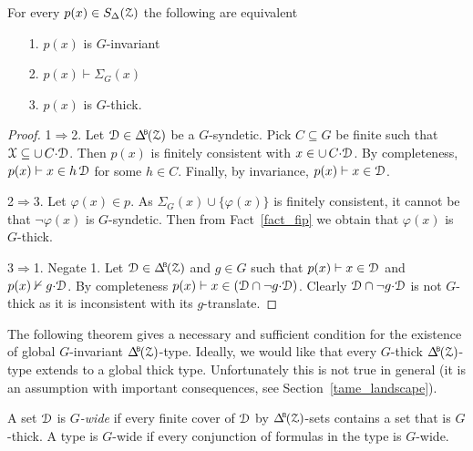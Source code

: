 
\begin{theorem}\label{thm_syndetic_invariant}
  For every $p(x)\in S_\Delta(\EuScript Z)$ the following are equivalent
  \begin{itemize}
    \item[1.] $p(x)$ is $G$-invariant
    \item[2.] $p(x)\vdash\Sigma_G(x)$
    \item[3.] $p(x)$ is $G$-thick.
  \end{itemize}
\end{theorem}

\begin{proof}
  1$\Rightarrow$2.
  Let $\D\in\BDelta(\Z)$ be a $G$-syndetic.
  Pick $C\subseteq G$ be finite such that $\EuScript X\subseteq\cup\,C{\cdot}\EuScript D$.
  Then $p(x)$ is finitely consistent with $x\in\cup\,C{\cdot}\EuScript D$.
  By completeness, $p(x)\vdash x\in h\,\EuScript D$ for some $h\in C$.
  Finally, by invariance, $p(x)\vdash x\in\EuScript D$.
  
  2$\Rightarrow$3.
  Let $\varphi(x)\in p$.
  As $\Sigma_G(x)\cup\{\varphi(x)\}$ is finitely consistent, it cannot be that $\neg\varphi(x)$ is $G$-syndetic.
  Then from Fact~\ref{fact_fip} we obtain that $\varphi(x)$ is $G$-thick.

  3$\Rightarrow$1.
  Negate 1.
  Let $\D\in\BDelta(\Z)$ and $g\in G$ such that $p(x)\vdash x\in\EuScript D$ and $p(x)\nvdash g{\cdot}\EuScript D$.
  By completeness $p(x)\vdash x\in(\EuScript D\cap\neg g{\cdot}\EuScript D)$.
  Clearly $\EuScript D\cap \neg g{\cdot}\EuScript D$ is not $G$-thick as it is inconsistent with its $g$-translate.
\end{proof}

The following theorem gives a necessary and sufficient condition for the  existence of global $G$-invariant $\BDelta(\Z)$-type.
Ideally, we would like that every $G$-thick $\BDelta(\Z)$-type extends to a global thick type.
Unfortunately this is not true in general (it is an assumption with important consequences, see Section~\ref{tame_landscape}).

A set $\EuScript D$ is \emph{$G$-wide\/} if every finite cover of $\EuScript D$ by $\BDelta(\Z)$-sets contains a set that is $G$-thick.
A type is $G$-wide if every conjunction of formulas in the type is $G$-wide.

